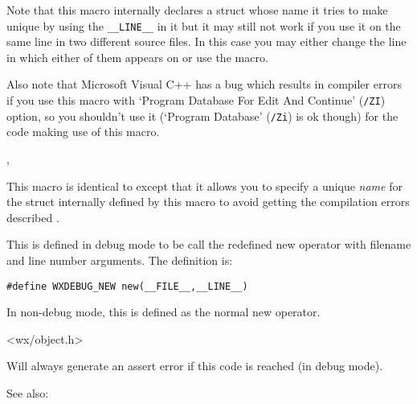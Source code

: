 Note that this macro internally declares a struct whose name it tries to make
unique by using the {\tt \_\_LINE\_\_} in it but it may still not work if you
use it on the same line in two different source files. In this case you may
either change the line in which either of them appears on or use the
 macro.

Also note that Microsoft Visual C++ has a bug which results in compiler errors
if you use this macro with `Program Database For Edit And Continue'
(\texttt{/ZI}) option, so you shouldn't use it (`Program Database'
(\texttt{/Zi}) is ok though) for the code making use of this macro.


,\\


\label{wxcompiletimeassert2}


This macro is identical to 
except that it allows you to specify a unique {\it name} for the struct
internally defined by this macro to avoid getting the compilation errors
described .


\label{debugnew}


This is defined in debug mode to be call the redefined new operator
with filename and line number arguments. The definition is:

\begin{verbatim}
#define WXDEBUG_NEW new(__FILE__,__LINE__)
\end{verbatim}

In non-debug mode, this is defined as the normal new operator.


<wx/object.h>


\label{wxfail}


Will always generate an assert error if this code is reached (in debug mode).

See also: 


